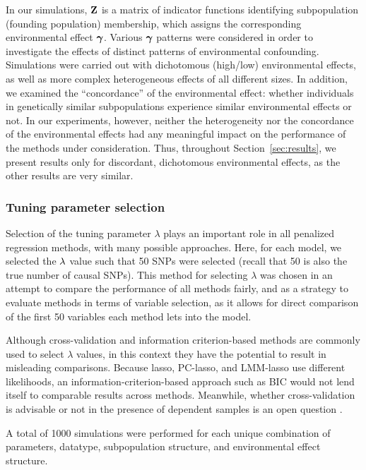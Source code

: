 In our simulations, $\mathbf{Z}$ is a matrix of indicator functions identifying subpopulation (founding population) membership, which assigns the corresponding environmental effect $\boldsymbol{\gamma}$. Various $\boldsymbol{\gamma}$ patterns were considered in order to investigate the effects of distinct patterns of environmental confounding.  Simulations were carried out with dichotomous (high/low) environmental effects, as well as more complex heterogeneous effects of all different sizes.  In addition, we examined the ``concordance'' of the environmental effect: whether individuals in genetically similar subpopulations experience similar environmental effects or not.  In our experiments, however, neither the heterogeneity nor the concordance of the environmental effects had any meaningful impact on the performance of the methods under consideration.  Thus, throughout Section~\ref{sec:results}, we present results only for discordant, dichotomous environmental effects, as the other results are very similar.

\subsubsection{Tuning parameter selection}

Selection of the tuning parameter $\lambda$ plays an important role in all penalized regression methods, with many possible approaches. Here, for each model, we selected the $\lambda$ value such that 50 SNPs were selected (recall that 50 is also the true number of causal SNPs). This method for selecting $\lambda$ was chosen in an attempt to compare the performance of all methods fairly, and as a strategy to evaluate methods in terms of variable selection, as it allows for direct comparison of the first 50 variables each method lets into the model.

Although cross-validation and information criterion-based methods are commonly used to select $\lambda$ values, in this context they have the potential to result in misleading comparisons. Because lasso, PC-lasso, and LMM-lasso use different likelihoods, an information-criterion-based approach such as BIC would not lend itself to comparable results across methods. Meanwhile, whether cross-validation is advisable or not in the presence of dependent samples is an open question \citep{roberts2017cross}.

A total of 1000 simulations were performed for each unique combination of parameters, datatype, subpopulation structure, and environmental effect structure. 


